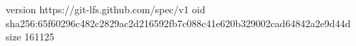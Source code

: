 version https://git-lfs.github.com/spec/v1
oid sha256:65f60296c482c2829ac2d216592fb7c088c41e620b329002cad64842a2e9d44d
size 161125
